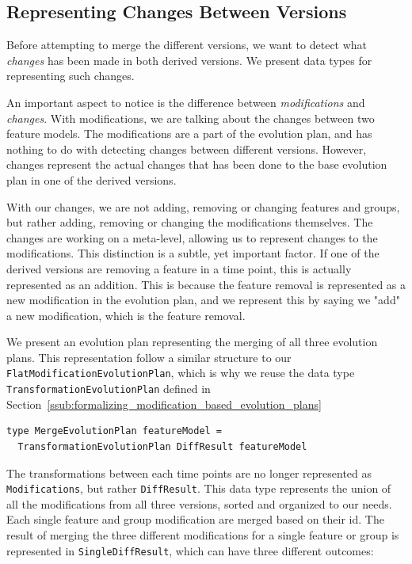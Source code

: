 \documentclass[a4paper,english]{ifimaster}
\begin{document}
\subsection{Representing Changes Between Versions}%
\label{sub:representing_changes_between_versions}

Before attempting to merge the different versions, we want to detect what \textit{changes} has been made in both derived versions. We present data types for representing such changes.

An important aspect to notice is the difference between \textit{modifications} and \textit{changes}. With modifications, we are talking about the changes between two feature models. The modifications are a part of the evolution plan, and has nothing to do with detecting changes between different versions. However, changes represent the actual changes that has been done to the base evolution plan in one of the derived versions.

With our changes, we are not adding, removing or changing features and groups, but rather adding, removing or changing the modifications themselves. The changes are working on a meta-level, allowing us to represent changes to the modifications. This distinction is a subtle, yet important factor. If one of the derived versions are removing a feature in a time point, this is actually represented as an addition. This is because the feature removal is represented as a new modification in the evolution plan, and we represent this by saying we "add" a new modification, which is the feature removal.

We present an evolution plan representing the merging of all three evolution plans. This representation follow a similar structure to our \texttt{FlatModificationEvolutionPlan}, which is why we reuse the data type \texttt{TransformationEvolutionPlan} defined in Section~\vref{ssub:formalizing_modification_based_evolution_plans}

\begin{verbatim}
type MergeEvolutionPlan featureModel = 
  TransformationEvolutionPlan DiffResult featureModel
\end{verbatim}

The transformations between each time points are no longer represented as \texttt{Modifications}, but rather \texttt{DiffResult}. This data type represents the union of all the modifications from all three versions, sorted and organized to our needs. Each single feature and group modification are merged based on their id. The result of merging the three different modifications for a single feature or group is represented in \texttt{SingleDiffResult}, which can have three different outcomes:
\end{document}
